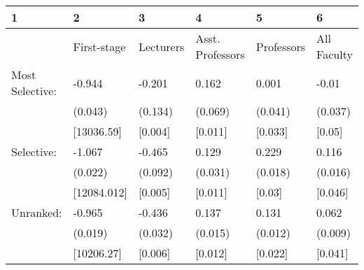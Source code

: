 \begin{tabular}{llllll}
  \hline
1 & 2 & 3 & 4 & 5 & 6 \\ 
  \hline
 & First-stage & Lecturers & Asst. Professors & Professors & All Faculty \\ 
  Most Selective: & -0.944 & -0.201 & 0.162 & 0.001 & -0.01 \\ 
   & (0.043) & (0.134) & (0.069) & (0.041) & (0.037) \\ 
   & [13036.59] & [0.004] & [0.011] & [0.033] & [0.05] \\ 
  Selective: & -1.067 & -0.465 & 0.129 & 0.229 & 0.116 \\ 
   & (0.022) & (0.092) & (0.031) & (0.018) & (0.016) \\ 
   & [12084.012] & [0.005] & [0.011] & [0.03] & [0.046] \\ 
  Unranked: & -0.965 & -0.436 & 0.137 & 0.131 & 0.062 \\ 
   & (0.019) & (0.032) & (0.015) & (0.012) & (0.009) \\ 
   & [10206.27] & [0.006] & [0.012] & [0.022] & [0.041] \\ 
   \hline
\end{tabular}
